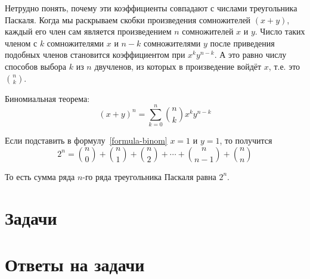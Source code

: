 \documentclass[14pt,openany]{book}
\begin{document}
Нетрудно понять, почему эти коэффициенты совпадают с числами треугольника Паскаля.
Когда мы раскрываем скобки произведения сомножителей $(x+y)$,
каждый его член сам является произведением $n$ сомножителей $x$ и $y$.
Число таких членом с $k$ сомножителями $x$ и $n-k$ сомножителями $y$ после приведения
подобных членов становится коэффициентом при $x^ky^{n-k}$. А это равно числу
способов выбора $k$ из $n$ двучленов, из которых в произведение войдёт $x$,
т.е. это $\binom{n}{k}$.

Биномиальная теорема:
\begin{equation}
\label{formula-binom}
(x+y)^n = \sum_{k=0}^{n}\binom{n}{k}x^ky^{n-k}
\end{equation}

Если подставить в формулу~\ref{formula-binom} $x=1$ и $y=1$, то получится
\begin{equation}
2^n = \binom{n}{0} + \binom{n}{1} + \binom{n}{2} + \cdots + \binom{n}{n-1} + \binom{n}{n}
\end{equation}

То есть сумма ряда $n$-го ряда треугольника Паскаля равна $2^n$.

\section{Задачи}



\section{Ответы на задачи}
\end{document}
